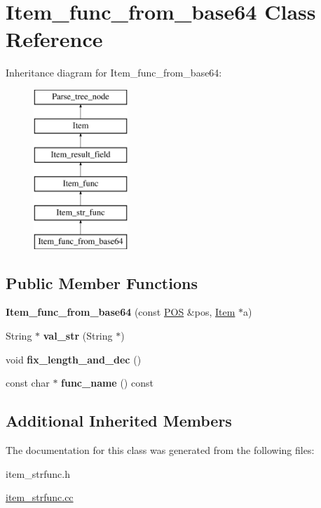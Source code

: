 \hypertarget{classItem__func__from__base64}{}\section{Item\+\_\+func\+\_\+from\+\_\+base64 Class Reference}
\label{classItem__func__from__base64}
Inheritance diagram for Item\+\_\+func\+\_\+from\+\_\+base64\+:\begin{figure}[H]
\begin{center}
\leavevmode
\includegraphics[height=6.000000cm]{classItem__func__from__base64}
\end{center}
\end{figure}
\subsection*{Public Member Functions}
\begin{DoxyCompactItemize}
\item 
\mbox{\label{classItem__func__from__base64_aac6de5cdaf905baf384410ab97d13552}} 
{\bfseries Item\+\_\+func\+\_\+from\+\_\+base64} (const \mbox{\hyperlink{structYYLTYPE}{P\+OS}} \&pos, \mbox{\hyperlink{classItem}{Item}} $\ast$a)
\item 
\mbox{\label{classItem__func__from__base64_a0a49844e8a262fe99cc00f16fe60cb66}} 
String $\ast$ {\bfseries val\+\_\+str} (String $\ast$)
\item 
\mbox{\label{classItem__func__from__base64_a20598b24d795553dbe4c5d5c446eaa05}} 
void {\bfseries fix\+\_\+length\+\_\+and\+\_\+dec} ()
\item 
\mbox{\label{classItem__func__from__base64_acb37505c01d44097f3aa9f04035b2666}} 
const char $\ast$ {\bfseries func\+\_\+name} () const
\end{DoxyCompactItemize}
\subsection*{Additional Inherited Members}


The documentation for this class was generated from the following files\+:\begin{DoxyCompactItemize}
\item 
item\+\_\+strfunc.\+h\item 
\mbox{\hyperlink{item__strfunc_8cc}{item\+\_\+strfunc.\+cc}}\end{DoxyCompactItemize}
